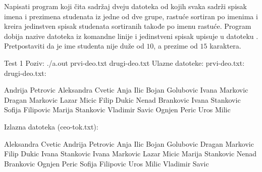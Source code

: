 \begin{Answer}[ref=505]
\end{Answer}
\begin{Exercise}[label=506]
  Napisati program koji čita sadržaj dveju datoteka od kojih svaka
  sadrži spisak imena i prezimena studenata iz jedne od dve grupe,
  rastuće sortiran po imenima i kreira jedinstven spisak studenata
  sortiranih takođe po imenu rastuće.  Program dobija nazive datoteka
  iz komandne linije i jedinstveni spisak upisuje u datoteku
  . Pretpostaviti da je ime studenta nije duže od
  $10$, a prezime od $15$ karaktera.


\begin{maxitest}
\begin{test}{Test 1}
Poziv: ./a.out prvi-deo.txt drugi-deo.txt
Ulazne datoteke:
  prvi-deo.txt:          drugi-deo.txt:

  Andrija Petrovic       Aleksandra Cvetic
  Anja Ilic              Bojan Golubovic
  Ivana Markovic         Dragan Markovic
  Lazar Micic            Filip Dukic
  Nenad Brankovic        Ivana Stankovic
  Sofija Filipovic       Marija Stankovic
  Vladimir Savic         Ognjen Peric
  Uros Milic

Izlazna datoteka (ceo-tok.txt):
  
  Aleksandra Cvetic
  Andrija Petrovic
  Anja Ilic
  Bojan Golubovic
  Dragan Markovic
  Filip Dukic
  Ivana Stankovic
  Ivana Markovic
  Lazar Micic
  Marija Stankovic
  Nenad Brankovic
  Ognjen Peric
  Sofija Filipovic
  Uros Milic
  Vladimir Savic
\end{test}
\end{maxitest}
  
\end{Exercise}

